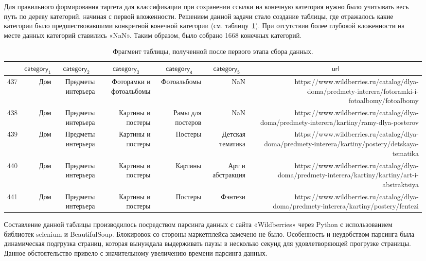 \documentclass[a4paper,12pt]{extarticle}
\begin{document}
Для правильного формирования таргета для классификации при сохранении ссылки на конечную категория нужно было учитывать весь путь по дереву категорий, начиная с первой вложенности. Решением данной задачи стало создание таблицы, где отражалось какие категории было предшествовавшими конкретной конечной категории (см. таблицу~\ref{table:datastatistic0}). При отсутствии более глубокой вложенности на месте данных категорий ставились «NaN». Таким образом, было собрано 1668 конечных категорий.

\begin{table}[ht]
\caption{Фрагмент таблицы, полученной после первого этапа сбора данных.}
\label{table:datastatistic0}
\footnotesize
\centering
	\begin{tabular}{lrrrrrr}
		\toprule
		{} & \multicolumn{1}{c}{$\mathsf{category_1}$} &\multicolumn{1}{c}{$\mathsf{category_2}$} &  \multicolumn{1}{c}{$\mathsf{category_3}$} & \multicolumn{1}{c}{$\mathsf{category_4}$} &  \multicolumn{1}{c}{$\mathsf{category_5}$} & \multicolumn{1}{c}{$\mathsf{url}$}\\
		\midrule
		437 & Дом & Предметы интерьера & Фоторамки и фотоальбомы & Фотоальбомы       & NaN              & https://www.wildberries.ru/catalog/dlya-doma/predmety-interera/fotoramki-i-fotoalbomy/fotoalbomy\\
		438 & Дом & Предметы интерьера & Картины и постеры       & Рамы для постеров & NaN              & https://www.wildberries.ru/catalog/dlya-doma/predmety-interera/kartiny/ramy-dlya-posterov\\
		439 & Дом & Предметы интерьера & Картины и постеры       & Постеры           & Детская тематика & https://www.wildberries.ru/catalog/dlya-doma/predmety-interera/kartiny/postery/detskaya-tematika\\
		440 & Дом & Предметы интерьера & Картины и постеры       & Картины           & Арт и абстракция & https://www.wildberries.ru/catalog/dlya-doma/predmety-interera/kartiny/kartiny/art-i-abstraktsiya\\
		441 & Дом & Предметы интерьера & Картины и постеры       & Постеры           & Фэнтези          & https://www.wildberries.ru/catalog/dlya-doma/predmety-interera/kartiny/postery/fentezi\\
		\bottomrule
	\end{tabular}
\end{table}

Составление данной таблицы производилось посредством парсинга данных с сайта «Wildberries» через Python с использованием библиотек selenium и BeautifulSoup. Блокировок со стороны маркетплейса замечено не было. Особенность и неудобством парсинга была динамическая подгрузка страниц, которая вынуждала выдерживать паузы в несколько секунд для удовлетворяющей прогрузке страницы. Данное обстоятельство привело с значительному увеличению времени парсинга данных.
\end{document}
